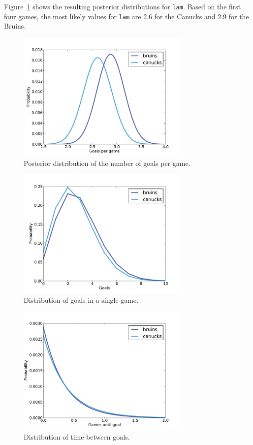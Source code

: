 \documentclass[12pt]{book}
\begin{document}
Figure~\ref{fig.hockey1} shows the resulting posterior distributions
for {\tt lam}.  Based on the first four games, the most likely
values for {\tt lam} are 2.6 for the Canucks and 2.9 for the Bruins.

\begin{figure}
\centerline{\includegraphics[height=2.5in]{figs/hockey1.pdf}}
\caption{Posterior distribution of the number of
goals per game.}
\label{fig.hockey1}
\end{figure}

\begin{figure}
\centerline{\includegraphics[height=2.5in]{figs/hockey2.pdf}}
\caption{Distribution of goals in a single game.}
\label{fig.hockey2}
\end{figure}

\begin{figure}
\centerline{\includegraphics[height=2.5in]{figs/hockey3.pdf}}
\caption{Distribution of time between goals.}
\label{fig.hockey3}
\end{figure}
\end{document}
